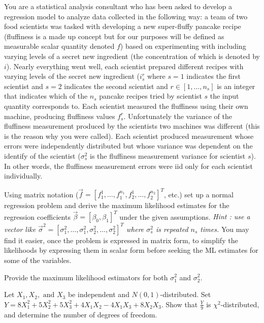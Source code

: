 \documentclass[12pt]{article}
\begin{document}
{
You are a statistical analysis consultant who has been asked to develop a regression model to analyze data collected in the following way:  a team of two food scientists was tasked with developing a new super-fluffy pancake recipe (fluffiness is a made up concept but for our purposes will be defined as measurable scalar quantity denoted $f$) based on experimenting with including varying levels of a secret new ingredient (the concentration of which is denoted by $i$).  Nearly everything went well, each scientist prepared different recipes with varying levels of the secret new ingredient ($i_s^r$ where $s=1$ indicates the first scientist and $s=2$ indicates the second scientist and $r \in [1, \ldots, n_s]$ is an integer that indicates which of the $n_s$ pancake recipes tried by scientist $s$ the input quantity corresponds to.   Each scientist measured the fluffiness using their own machine, producing fluffiness values $f_s^r$.  Unfortunately the variance of the fluffiness measurement produced by the scientists two machines was different (this is the reason why you were called).  Each scientist produced measurement whose errors were independently distributed but whose variance was dependent on the identify of the scientist ($\sigma^2_s$ is the fluffiness measurement variance for scientist $s$).   In other words, the fluffiness measurement errors were iid only for each scientist individually.

\abcs 
\item Using matrix notation ($\vec f = [f_1^1,\ldots,f_1^{n_1}, f_2^1,\ldots,f_2^{n_2}]^T$, etc.) set up a normal regression problem and derive the maximum likelihood estimates for the regression coefficients $\vec \beta = [\beta_0, \beta_1]^T$ under the given assumptions.  {\em Hint : use a vector like $\vec{\sigma}^2 = [\sigma^2_1,\ldots,\sigma^2_1, \sigma^2_2,\ldots,\sigma^2_2]^T$ where $\sigma^2_s$ is repeated $n_s$ times.}  You may find it easier, once the problem is expressed in matrix form, to simplify the likelihoods by expressing them in scalar form before seeking the ML estimates for some of the variables.
\item Provide the maximum likelihood estimators for both $\sigma^2_1$ and $\sigma^2_2.$
\endabcs
}
{
\vfill
\newpage
}
{
}


{
Let  $X_1, X_2, \mbox{ and } X_3$  be independent and $N(0,1)$-distributed.  Set $Y=8X_1^2 + 5 X_2^2 + 5X_3^2 + 4 X_1X_2 -4 X_1X_3 + 8X_2X_3$.  Show that $\frac{Y}{9}$ is $\chi^2$-distributed, and determine the number of degrees of freedom. }
{
\vfill
\newpage
}
{
}




\problemsdone
\end{document}
